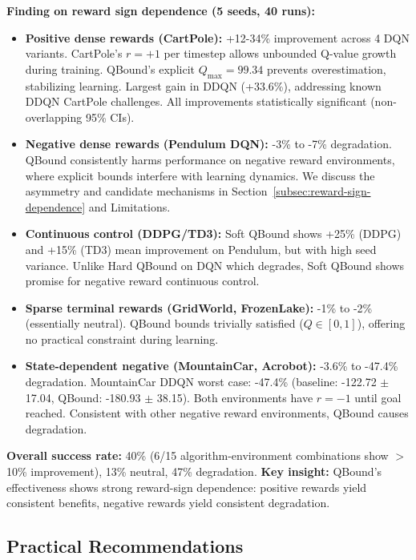 \documentclass[11pt]{article}
\theoremstyle{definition}
\theoremstyle{remark}
\begin{document}
\textbf{Finding on reward sign dependence (5 seeds, 40 runs):}
\begin{itemize}
    \item \textbf{Positive dense rewards (CartPole):} +12-34\% improvement across 4 DQN variants. CartPole's $r = +1$ per timestep allows unbounded Q-value growth during training. QBound's explicit $Q_{\max} = 99.34$ prevents overestimation, stabilizing learning. Largest gain in DDQN (+33.6\%), addressing known DDQN CartPole challenges. All improvements statistically significant (non-overlapping 95\% CIs).

    \item \textbf{Negative dense rewards (Pendulum DQN):} -3\% to -7\% degradation. QBound consistently harms performance on negative reward environments, where explicit bounds interfere with learning dynamics. We discuss the asymmetry and candidate mechanisms in Section~\ref{subsec:reward-sign-dependence} and Limitations.

    \item \textbf{Continuous control (DDPG/TD3):} Soft QBound shows +25\% (DDPG) and +15\% (TD3) mean improvement on Pendulum, but with high seed variance. Unlike Hard QBound on DQN which degrades, Soft QBound shows promise for negative reward continuous control.

    \item \textbf{Sparse terminal rewards (GridWorld, FrozenLake):} -1\% to -2\% (essentially neutral). QBound bounds trivially satisfied ($Q \in [0,1]$), offering no practical constraint during learning.

    \item \textbf{State-dependent negative (MountainCar, Acrobot):} -3.6\% to -47.4\% degradation. MountainCar DDQN worst case: -47.4\% (baseline: -122.72 $\pm$ 17.04, QBound: -180.93 $\pm$ 38.15). Both environments have $r = -1$ until goal reached. Consistent with other negative reward environments, QBound causes degradation.
\end{itemize}

\textbf{Overall success rate:} 40\% (6/15 algorithm-environment combinations show $>$10\% improvement), 13\% neutral, 47\% degradation. \textbf{Key insight:} QBound's effectiveness shows strong reward-sign dependence: positive rewards yield consistent benefits, negative rewards yield consistent degradation.

\subsection{Practical Recommendations}
\end{document}
